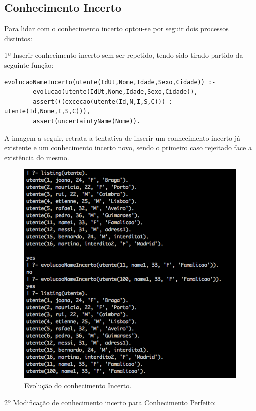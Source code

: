 \documentclass[25pt]{article}
\begin{document}
\subsection{Conhecimento Incerto}

Para lidar com o conhecimento incerto optou-se por seguir dois processos distintos:\newline

1º Inserir conhecimento incerto sem ser repetido, tendo sido tirado partido da seguinte função:
\begin{lstlisting}
evolucaoNameIncerto(utente(IdUt,Nome,Idade,Sexo,Cidade)) :-
        evolucao(utente(IdUt,Nome,Idade,Sexo,Cidade)),
        assert(((excecao(utente(Id,N,I,S,C))) :- utente(Id,Nome,I,S,C))),
        assert(uncertaintyName(Nome)).
\end{lstlisting}

A imagem a seguir, retrata a tentativa de inserir um conhecimento incerto já existente e um conhecimento incerto
novo, sendo o primeiro caso rejeitado face a existência do mesmo.

\begin{figure}[H]
\centering\includegraphics[scale=0.55]{eincerto}
\caption{\label{fig:controller} Evolução do conhecimento Incerto.}
\end{figure}

2º Modificação de conhecimento incerto para Conhecimento Perfeito:
\end{document}

